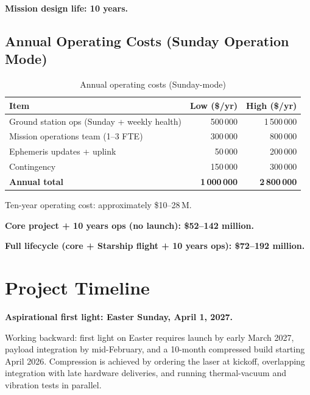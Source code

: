 \documentclass[10pt,letterpaper]{article}
\begin{document}
\textbf{Mission design life: 10 years.}

\subsection{Annual Operating Costs (Sunday Operation Mode)}

\begin{table}[!ht]
\centering\small
\caption{Annual operating costs (Sunday-mode)}
\label{tab:ops-costs}
\begin{tabularx}{\linewidth}{Xrr}
\toprule
\textbf{Item} & \textbf{Low (\$/yr)} & \textbf{High (\$/yr)} \\
\midrule
Ground station ops (Sunday + weekly health) & 500\,000 & 1\,500\,000 \\
Mission operations team (1--3 FTE) & 300\,000 & 800\,000 \\
Ephemeris updates + uplink & 50\,000 & 200\,000 \\
Contingency & 150\,000 & 300\,000 \\
\midrule
\textbf{Annual total} & \textbf{1\,000\,000} & \textbf{2\,800\,000} \\
\bottomrule
\end{tabularx}
\end{table}

\noindent Ten-year operating cost: approximately \$10--28\,M.

\medskip
\noindent \textbf{Core project + 10 years ops (no launch): \$52--142 million.}

\noindent \textbf{Full lifecycle (core + Starship flight + 10 years ops):
\$72--192 million.}

\section{Project Timeline}

\textbf{Aspirational first light: Easter Sunday, April 1, 2027.}

\medskip
\noindent Working backward: first light on Easter requires launch by early March
2027, payload integration by mid-February, and a 10-month compressed build
starting April 2026. Compression is achieved by ordering the laser at kickoff,
overlapping integration with late hardware deliveries, and running
thermal-vacuum and vibration tests in parallel.
\end{document}

